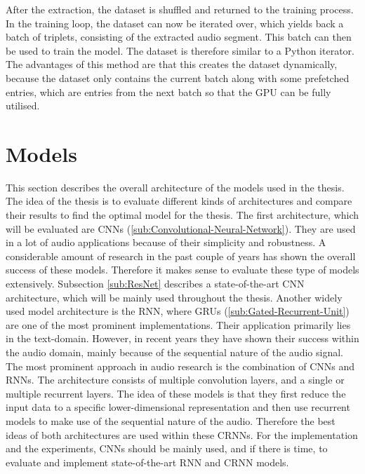 \newline
\newline
After the extraction, the dataset is shuffled and returned to the training process. In the training loop, the dataset can now be iterated over, which yields back a batch of triplets, consisting of the extracted audio segment. This batch can then be used to train the model. The dataset is therefore similar to a Python iterator.
\newline
\newline
The advantages of this method are that this creates the dataset dynamically, because the dataset only contains the current batch along with some prefetched entries, which are entries from the next batch so that the \gls{GPU} can be fully utilised.

\section{Models}
\label{sec:Models}
This section describes the overall architecture of the models used in the thesis. The idea of the thesis is to evaluate different kinds of architectures and compare their results to find the optimal model for the thesis.
\newline
\newline
The first architecture, which will be evaluated are \glspl{CNN} (\ref{sub:Convolutional-Neural-Network}). They are used in a lot of audio applications because of their simplicity and robustness. A considerable amount of research in the past couple of years has shown the overall success of these models. Therefore it makes sense to evaluate these type of models extensively. Subsection \ref{sub:ResNet} describes a state-of-the-art \gls{CNN} architecture, which will be mainly used throughout the thesis.
\newline
\newline
Another widely used model architecture is the \gls{RNN}, where \glspl{GRU} (\ref{sub:Gated-Recurrent-Unit}) are one of the most prominent implementations. Their application primarily lies in the text-domain. However, in recent years they have shown their success within the audio domain, mainly because of the sequential nature of the audio signal.
\newline
\newline
The most prominent approach in audio research is the combination of \glspl{CNN} and \glspl{RNN}. The architecture consists of multiple convolution layers, and a single or multiple recurrent layers. The idea of these models is that they first reduce the input data to a specific lower-dimensional representation and then use recurrent models to make use of the sequential nature of the audio. Therefore the best ideas of both architectures are used within these \glspl{CRNN}.
\newline
\newline
For the implementation and the experiments, \glspl{CNN} should be mainly used, and if there is time, to evaluate and implement state-of-the-art \gls{RNN} and \gls{CRNN} models.

